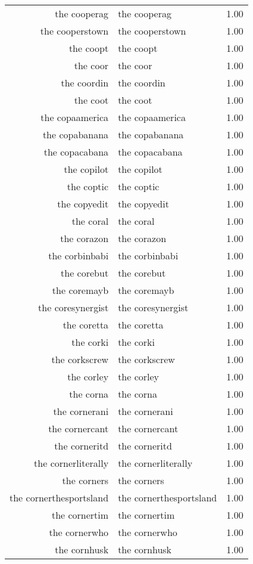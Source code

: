 \begin{table}[ht]
\begin{tabular}{rlr}
  the cooperag & the cooperag & 1.00 \\ 
  the cooperstown & the cooperstown & 1.00 \\ 
  the coopt & the coopt & 1.00 \\ 
  the coor & the coor & 1.00 \\ 
  the coordin & the coordin & 1.00 \\ 
  the coot & the coot & 1.00 \\ 
  the copaamerica & the copaamerica & 1.00 \\ 
  the copabanana & the copabanana & 1.00 \\ 
  the copacabana & the copacabana & 1.00 \\ 
  the copilot & the copilot & 1.00 \\ 
  the coptic & the coptic & 1.00 \\ 
  the copyedit & the copyedit & 1.00 \\ 
  the coral & the coral & 1.00 \\ 
  the corazon & the corazon & 1.00 \\ 
  the corbinbabi & the corbinbabi & 1.00 \\ 
  the corebut & the corebut & 1.00 \\ 
  the coremayb & the coremayb & 1.00 \\ 
  the coresynergist & the coresynergist & 1.00 \\ 
  the coretta & the coretta & 1.00 \\ 
  the corki & the corki & 1.00 \\ 
  the corkscrew & the corkscrew & 1.00 \\ 
  the corley & the corley & 1.00 \\ 
  the corna & the corna & 1.00 \\ 
  the cornerani & the cornerani & 1.00 \\ 
  the cornercant & the cornercant & 1.00 \\ 
  the corneritd & the corneritd & 1.00 \\ 
  the cornerliterally & the cornerliterally & 1.00 \\ 
  the corners & the corners & 1.00 \\ 
  the cornerthesportsland & the cornerthesportsland & 1.00 \\ 
  the cornertim & the cornertim & 1.00 \\ 
  the cornerwho & the cornerwho & 1.00 \\ 
  the cornhusk & the cornhusk & 1.00 \\ 

\end{tabular}
\end{table}
